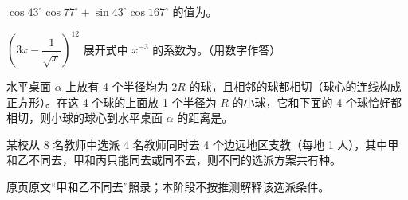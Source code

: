 \begin{question}
\(\cos43^\circ\cos77^\circ+\sin43^\circ\cos167^\circ\) 的值为\gkblank{}。

\end{question}
\begin{question}
\(\left(3x-\dfrac1{\sqrt{x}}\right)^{12}\) 展开式中 \(x^{-3}\) 的系数为\gkblank{}。（用数字作答）

\end{question}
\begin{question}
水平桌面 \(\alpha\) 上放有 4 个半径均为 \(2R\) 的球，且相邻的球都相切（球心的连线构成正方形）。在这 4 个球的上面放 1 个半径为 \(R\) 的小球，它和下面的 4 个球恰好都相切，则小球的球心到水平桌面 \(\alpha\) 的距离是\gkblank{}。

\end{question}
\begin{question}
某校从 8 名教师中选派 4 名教师同时去 4 个边远地区支教（每地 1 人），其中甲和乙不同去，甲和丙只能同去或同不去，则不同的选派方案共有\gkblank{}种。

\begin{gktip}
原页原文“甲和乙不同去”照录；本阶段不按推测解释该选派条件。
\end{gktip}

\end{question}


